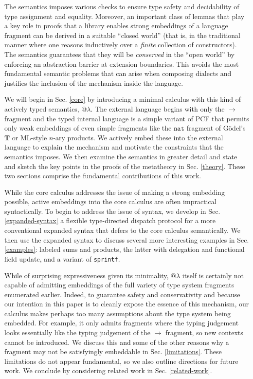 \documentclass[9pt,preprint]{sigplanconf}
\begin{document}
The semantics imposes various checks to ensure type safety and decidability of type assignment and equality. Moreover, an important class of lemmas that play a key role in  proofs that a library enables strong embeddings of a language fragment can be derived in a suitable ``closed world'' (that is, in the traditional manner where one reasons inductively over a \emph{finite} collection of constructors). The semantics guarantees that they will be \emph{conserved} in the  ``open world'' by enforcing an abstraction barrier at extension boundaries. This avoids the most fundamental semantic problems that can arise when composing dialects and justifies the inclusion of the mechanism inside the language.

We will begin in Sec. \ref{core} by introducing a minimal calculus with this kind of {actively typed} semantics, @$\lambda$. The external language begins with only the $\rightarrow$ fragment and the typed internal language is a simple variant of PCF that permits only weak embeddings of even simple fragments like the $\mathtt{nat}$ fragment of G\"odel's $\mathbf{T}$ or ML-style $n$-ary products. We actively embed these into the external language to explain the mechanism and motivate the constraints that the semantics imposes. We then examine the semantics in greater detail and state and sketch the key points in the proofs of the metatheory in Sec. \ref{theory}. These two sections comprise the fundamental contributions of this work.

While the core calculus addresses the issue of making a strong embedding possible, active embeddings into the core calculus are often impractical syntactically. To begin to address the issue of syntax, we develop in Sec. \ref{expanded-syntax} a flexible type-directed dispatch protocol for a more conventional {expanded syntax} that defers to the core calculus semantically. We then use the expanded syntax to discuss several more interesting examples in Sec. \ref{examples}: labeled sums and products, the latter with delegation and functional field update, and a variant of \verb|sprintf|.

While of surprising expressiveness given its minimality, @$\lambda$ itself is certainly not capable of admitting embeddings of the full variety of type system fragments enumerated earlier. Indeed, to guarantee safety and conservativity and because our intention in this paper is to cleanly expose the essence of this mechanism, our calculus makes perhaps too many assumptions about the type system being embedded. For example, it only admits fragments where the typing judgement looks essentially like the typing judgement of the $\rightarrow$ fragment, so new contexts cannot be introduced. We discuss this and some of the other reasons why a fragment may not be satisfyingly embeddable in Sec. \ref{limitations}. These limitations do not appear fundamental, so we also outline directions for future work. We conclude by considering related work in Sec. \ref{related-work}. 
\end{document}
